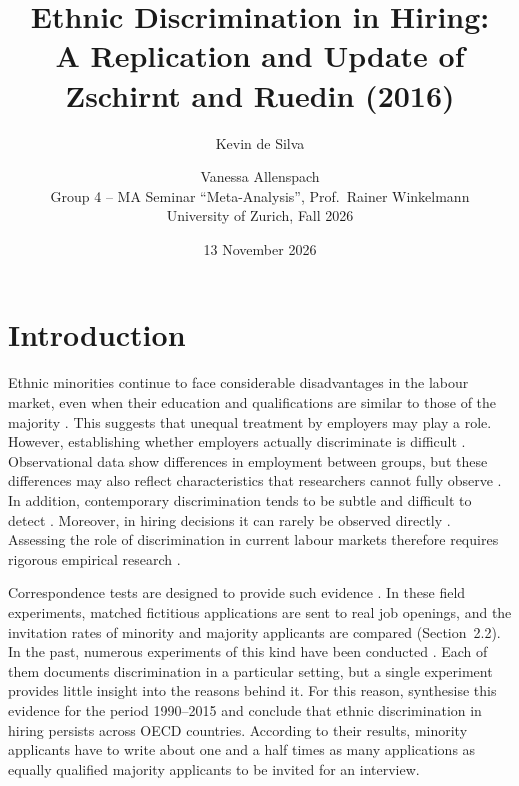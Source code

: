 \documentclass[11pt,a4paper]{article}
\title{Ethnic Discrimination in Hiring:\\
  A Replication and Update of Zschirnt and Ruedin (2016)}
\author{Kevin de Silva \and Vanessa Allenspach\\[1em]
  \subitem Group 4 -- MA Seminar ``Meta-Analysis'', Prof.\ Rainer Winkelmann\\
  \subitem University of Zurich, Fall 2026}
\date{13 November 2026}
\begin{document}
\begin{titlepage}
  \maketitle
  \thispagestyle{empty}
\end{titlepage}

\tableofcontents
\newpage

\section{Introduction}

Ethnic minorities continue to face considerable disadvantages in the labour
market, even when their education and qualifications are similar to those
of the majority \citep{heath2006}. This suggests that unequal treatment by
employers may play a role. However, establishing whether employers actually
discriminate is difficult \citep{pager2007}. Observational data show
differences in employment between groups, but these differences may also
reflect characteristics that researchers cannot fully observe
\citep{zschirnt2016}. In addition, contemporary discrimination tends to be
subtle and difficult to detect \citep{pager2008}. Moreover, in hiring
decisions it can rarely be observed directly \citep{zschirnt2016}.
Assessing the role of discrimination in current labour markets therefore
requires rigorous empirical research \citep{pager2007}.

Correspondence tests are designed to provide such evidence
\citep{riach2002}. In these field experiments, matched fictitious
applications are sent to real job openings, and the invitation rates of
minority and majority applicants are compared (Section~2.2).
In the past, numerous experiments of this kind have been
conducted \citep[e.g.][]{bertrand2004,riach2002}. Each of them documents
discrimination in a particular setting, but a single experiment provides
little insight into the reasons behind it. For this reason, \citet{zschirnt2016} synthesise this evidence for the period 1990--2015 and
conclude that ethnic discrimination in hiring persists across OECD
countries. According to their results, minority applicants have to write
about one and a half times as many applications as equally qualified
majority applicants to be invited for an interview.
\end{document}

